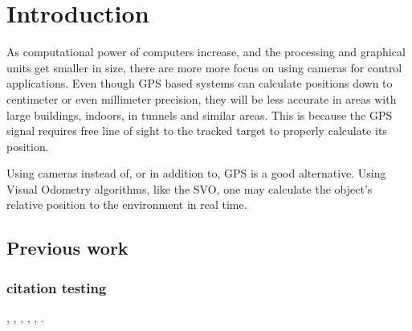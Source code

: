 
\chapter{Introduction}

As computational power of computers increase, and the processing and graphical units get smaller in size, there are more more focus on using cameras for control applications. Even though GPS based systems can calculate positions down to centimeter or even millimeter precision\cite{GPSaccuracy}, they will be less accurate in areas with large buildings, indoors, in tunnels and similar areas. This is because the GPS signal requires free line of sight to the tracked target to properly calculate its position.

Using cameras instead of, or in addition to, GPS is a good alternative. Using Visual Odometry algorithms, like the SVO\cite{SVOpaper}, one may calculate the object's relative position to the environment in real time.




\section{Previous work}




\subsection*{citation testing}
\cite{Airsim_paper}, \cite{Sim4CV_paper}, \cite{Zhang2016BenefitOL}, \cite{endoscopypano}, \cite{GPSaccuracy}, \cite{SVOpaper}.